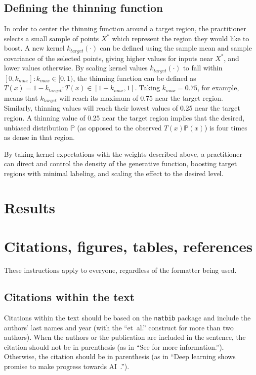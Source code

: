\documentclass{article} %
\begin{document}
\subsection{Defining the thinning function}
In order to center the thinning function around a target region, the practitioner selects a small sample of points $X^*$ which represent the region they would like to boost. A new kernel $k_{target}(\cdot)$ can be defined using the sample mean and sample covariance of the selected points, giving higher values for inputs near $X^*$, and lower values otherwise. By scaling kernel values $k_{target}(\cdot)$ to fall within $[0, k_{max}]: k_{max} \in [0,1)$, the thinning function can be defined as $T(x) = 1 - k_{target} : T(x) \in [1-k_{max}, 1]$. Taking $k_{max}=0.75$, for example, means that $k_{target}$ will reach its maximum of 0.75 near the target region. Similarly, thinning values will reach their lowest values of 0.25 near the target region. A thinning value of 0.25 near the target region implies that the desired, unbiased distribution $\mathbb{P}$ (as opposed to the observed $T(x)\mathbb{P}(x)$) is four times as dense in that region.

By taking kernel expectations with the weights described above, a practitioner can direct and control the density of the generative function, boosting target regions with minimal labeling, and scaling the effect to the desired level.

\section{Results}




\pagebreak
\section{Citations, figures, tables, references}
\label{others}

These instructions apply to everyone, regardless of the formatter being used.

\subsection{Citations within the text}

Citations within the text should be based on the \texttt{natbib} package
and include the authors' last names and year (with the ``et~al.'' construct
for more than two authors). When the authors or the publication are
included in the sentence, the citation should not be in parenthesis (as
in ``See \citet{Hinton06} for more information.''). Otherwise, the citation
should be in parenthesis (as in ``Deep learning shows promise to make progress towards AI~\citep{Bengio+chapter2007}.'').
\end{document}
